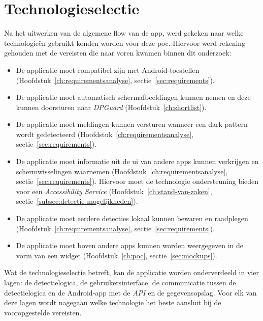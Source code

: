 \newpage

\section{Technologieselectie}
\label{sec:technologieselectie}

\vspace{1em}

Na het uitwerken van de algemene flow van de app, werd gekeken naar welke technologieën gebruikt konden worden voor deze \acrshort{poc}. Hiervoor werd rekening gehouden met de vereisten die naar voren kwamen binnen dit onderzoek:

\begin{itemize}
    \item De applicatie moet compatibel zijn met Android-toestellen (Hoofdstuk~\ref{ch:requirementsanalyse}, sectie~\ref{sec:requirements}).
    
    \item De applicatie moet automatisch schermafbeeldingen kunnen nemen en deze kunnen doorsturen naar \textit{DPGuard} (Hoofdstuk~\ref{ch:shortlist}).
    
    \item De applicatie moet meldingen kunnen versturen wanneer een dark pattern wordt gedetecteerd (Hoofdstuk~\ref{ch:requirementsanalyse}, sectie~\ref{sec:requirements}).
    
    \item De applicatie moet informatie uit de \acrshort{ui} van andere apps kunnen verkrijgen en schermwisselingen waarnemen (Hoofdstuk~\ref{ch:requirementsanalyse}, sectie~\ref{sec:requirements}). Hiervoor moet de technologie ondersteuning bieden voor een \textit{Accessibility Service} (Hoofdstuk~\ref{ch:stand-van-zaken}, sectie~\ref{subsec:detectie-mogelijkheden}).
    
    \item De applicatie moet eerdere detecties lokaal kunnen bewaren en raadplegen (Hoofdstuk~\ref{ch:requirementsanalyse}, sectie~\ref{sec:requirements}).
    
    \item De applicatie moet boven andere apps kunnen worden weergegeven in de vorm van een widget (Hoofdstuk~\ref{ch:poc}, sectie~\ref{sec:mockups}).
\end{itemize}

Wat de technologieselectie betreft, kan de applicatie worden onderverdeeld in vier lagen: de detectielogica, de gebruikersinterface, de communicatie tussen de detectielogica en de Android-app met de \textit{API} en de gegevensopslag. Voor elk van deze lagen wordt nagegaan welke technologie het beste aansluit bij de vooropgestelde vereisten.


